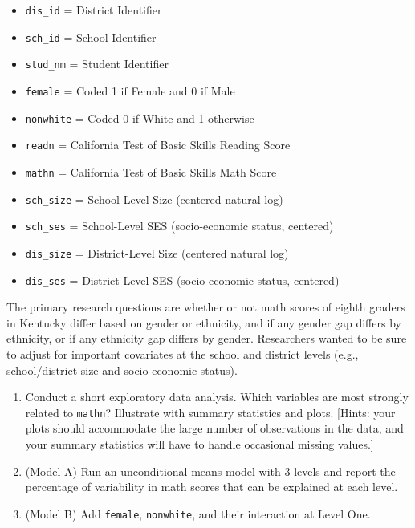 \documentclass[
]{krantz}
\providecommand{\tightlist}{%
  \setlength{\itemsep}{0pt}\setlength{\parskip}{0pt}}
\begin{document}
\begin{enumerate}
  \begin{itemize}
  \tightlist
  \item
    \texttt{dis\_id} = District Identifier
  \item
    \texttt{sch\_id} = School Identifier
  \item
    \texttt{stud\_nm} = Student Identifier
  \item
    \texttt{female} = Coded 1 if Female and 0 if Male
  \item
    \texttt{nonwhite} = Coded 0 if White and 1 otherwise
  \item
    \texttt{readn} = California Test of Basic Skills Reading Score
  \item
    \texttt{mathn} = California Test of Basic Skills Math Score
  \item
    \texttt{sch\_size} = School-Level Size (centered natural log)
  \item
    \texttt{sch\_ses} = School-Level SES (socio-economic status, centered)
  \item
    \texttt{dis\_size} = District-Level Size (centered natural log)
  \item
    \texttt{dis\_ses} = District-Level SES (socio-economic status, centered)
  \end{itemize}

  The primary research questions are whether or not math scores of eighth graders in Kentucky differ based on gender or ethnicity, and if any gender gap differs by ethnicity, or if any ethnicity gap differs by gender. Researchers wanted to be sure to adjust for important covariates at the school and district levels (e.g., school/district size and socio-economic status).

  \begin{enumerate}
  \def\labelenumii{\alph{enumii}.}
  \tightlist
  \item
    Conduct a short exploratory data analysis. Which variables are most strongly related to \texttt{mathn}? Illustrate with summary statistics and plots. {[}Hints: your plots should accommodate the large number of observations in the data, and your summary statistics will have to handle occasional missing values.{]}
  \item
    (Model A) Run an unconditional means model with 3 levels and report the percentage of variability in math scores that can be explained at each level.
  \item
    (Model B) Add \texttt{female}, \texttt{nonwhite}, and their interaction at Level One.


\end{enumerate}
\end{enumerate}
\end{document}
